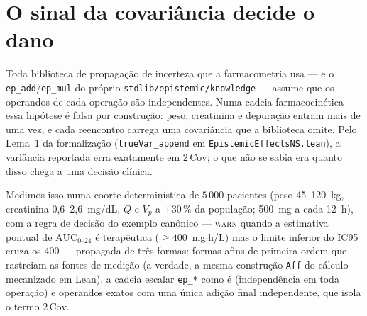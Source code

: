 
\section{O sinal da covariância decide o dano}
\label{sec:sinal-covariancia}

Toda biblioteca de propagação de incerteza que a farmacometria usa --- e o
\texttt{ep\_add}/\texttt{ep\_mul} do próprio \texttt{stdlib/epistemic/knowledge} ---
assume que os operandos de cada operação são independentes. Numa cadeia farmacocinética
essa hipótese é falsa por construção: peso, creatinina e depuração entram mais de uma vez,
e cada reencontro carrega uma covariância que a biblioteca omite. Pelo Lema~1 da
formalização (\texttt{trueVar\_append} em \texttt{EpistemicEffectsNS.lean}), a variância
reportada erra exatamente em $2\,\mathrm{Cov}$; o que não se sabia era quanto disso chega a
uma decisão clínica.

Medimos isso numa coorte determinística de $5\,000$ pacientes (peso 45--120~kg,
creatinina 0,6--2,6~mg/dL, $Q$ e $V_p$ a $\pm 30\,\%$ da população; 500~mg a cada 12~h),
com a regra de decisão do exemplo canônico --- \textsc{warn} quando a estimativa pontual
de $\mathrm{AUC}_{0\text{--}24}$ é terapêutica ($\geq 400$~mg$\cdot$h/L) mas o limite
inferior do IC95 cruza os 400 --- propagada de três formas: formas afins de primeira ordem
que rastreiam as fontes de medição (a verdade, a mesma construção \texttt{Aff} do cálculo
mecanizado em Lean), a cadeia escalar \texttt{ep\_*} como é (independência em toda
operação) e operandos exatos com uma única adição final independente, que isola o termo
$2\,\mathrm{Cov}$.

